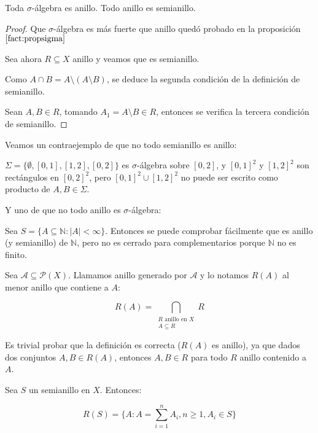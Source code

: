 \begin{fact}
 Toda $\sigma$-álgebra es anillo. Todo anillo es semianillo.
\end{fact}

\begin{proof}
 Que $\sigma$-álgebra es más fuerte que anillo quedó probado en la proposición $\ref{fact:propsigma}$
 
 Sea ahora $R \subseteq X$ anillo y veamos que es semianillo.

 Como $A\cap B = A\setminus (A\setminus B)$, se deduce la segunda condición de la definición de semianillo.
 
 Sean $A, B \in R$, tomando $A_1 = A\setminus B \in R$, entonces se verifica la tercera condición de semianillo.
\end{proof}

\begin{counterex}
 Veamos un contraejemplo de que no todo semianillo es anillo:
 
 $\Sigma = \{\emptyset, [0,1], [1,2], [0,2]\}$ es $\sigma$-álgebra sobre $[0,2]$, y $[0,1]^2$ y $[1,2]^2$ son rectángulos
 en $[0,2]^2$, pero $[0,1]^2 \cup [1,2]^2$ no puede ser escrito como producto de $A,B \in \Sigma$.
 
 Y uno de que no todo anillo es $\sigma$-álgebra:
 
 Sea $S = \{A\subseteq \mathbb{N}: |A| < \infty\}$. Entonces se puede comprobar fácilmente que es anillo (y semianillo)
 de $\mathbb{N}$, pero no es cerrado para complementarios porque $\mathbb{N}$ no es finito.
\end{counterex}


\begin{definition}
 Sea $\mathcal{A} \subseteq \mathcal{P}(X)$. Llamamos anillo generado por $\mathcal{A}$ y lo notamos $R(A)$ al
 menor anillo que contiene a $A$:
 
 \[R(A) = \bigcap_{\begin{array}{c}R \textrm{ anillo en } X\\ A\subseteq R \end{array}} R\]
\end{definition}

Es trivial probar que la definición es correcta ($R(A)$ es anillo), ya que dados dos conjuntos $A,B \in R(A)$, 
entonces $A, B \in R$ para todo $R$ anillo contenido a $A$.

\begin{fact}
 Sea $S$ un semianillo en $X$. Entonces:
 
 \[R(S) = \{A: A=\sum_{i=1}^n A_i, n\ge 1, A_i \in S\}\]
 
 \label{claim:semiring}
\end{fact}

